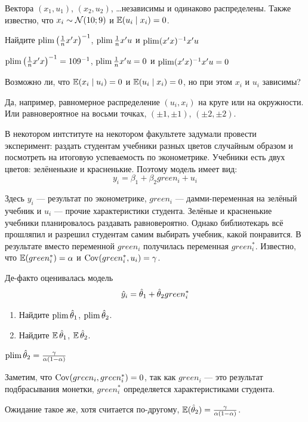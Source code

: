 \begin{problem}
Вектора $(x_1, u_1)$, $(x_2, u_2)$, \ldots независимы и одинаково распределены. Также известно, что $x_i \sim \mathcal{N}(10; 9)$ и $\operatorname{\mathbb E}(u_i \mid x_i)=0$.

Найдите $\operatorname*{plim} \left(\frac{1}{n}x'x\right)^{-1}$, $\operatorname*{plim} \frac{1}{n}x'u$ и $\operatorname*{plim} (x'x)^{-1}x'u$
\begin{sol}
$\operatorname*{plim} \left(\frac{1}{n}x'x\right)^{-1} = 109^{-1}$, $\operatorname*{plim} \frac{1}{n}x'u = 0$ и $\operatorname*{plim} (x'x)^{-1}x'u = 0$
\end{sol}
\end{problem}


\begin{problem}
  Возможно ли, что $\operatorname{\mathbb E}(x_i \mid u_i)=0$ и $\operatorname{\mathbb E}(u_i \mid x_i)=0$, но при этом $x_i$ и $u_i$ зависимы?
\begin{sol}
  Да, например, равномерное распределение $(u_i, x_i)$ на круге или на окружности. Или равновероятное на восьми точках, $(\pm 1, \pm 1)$, $(\pm 2, \pm 2)$.
\end{sol}
\end{problem}


\begin{problem}
В некотором интституте на некотором факультете задумали провести эксперимент: раздать студентам учебники разных цветов случайным образом и посмотреть на итоговую успеваемость по эконометрике. Учебники есть двух цветов: зелёненькие и красненькие. Поэтому модель имеет вид:
\[
y_i = \beta_1 + \beta_2 green_i + u_i
\]

Здесь $y_i$ — результат по эконометрике, $green_i$ — дамми-переменная на зелёный учебник и $u_i$ — прочие характеристики студента. Зелёные и красненькие учебники планировалось раздавать равновероятно. Однако библиотекарь всё прошляпил и разрешил студентам самим выбирать учебник, какой понравится. В результате вместо переменной $green_i$ получилась переменная $green_i^*$. Известно, что $\operatorname{\mathbb E}(green_i^*)=\alpha$ и $\operatorname{Cov}(green_i^*, u_i)=\gamma$.

Де-факто оценивалась модель
\[
\hat{y}_i = \hat \theta_1 + \hat \theta_2 green_i^*
\]

\begin{enumerate}
\item Найдите $\operatorname*{plim} \hat \theta_1$, $\operatorname*{plim} \hat \theta_2$.
\item Найдите $\operatorname{\mathbb E} \hat \theta_1$, $\operatorname{\mathbb E} \hat \theta_2$.
\end{enumerate}

\begin{sol}

$\operatorname*{plim} \hat \theta_2 = \frac{\gamma}{\alpha (1-\alpha)}$

Заметим, что $\operatorname{Cov}(green_i, green_i^*) = 0$, так как $green_i$ — это результат подбрасывания монетки, $green_i^*$ определяется характеристиками студента.

Ожидание такое же, хотя считается по-другому, $\operatorname{\mathbb E}(\hat \theta_2) = \frac{\gamma}{\alpha (1-\alpha)}$.

\end{sol}
\end{problem}

